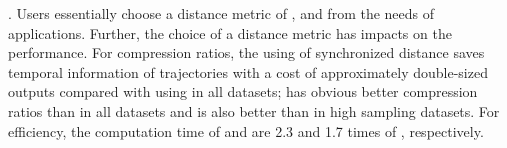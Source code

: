 . Users essentially choose a distance metric of \ped, \sed and \dad from the needs of applications. Further, the choice of a distance metric has impacts on the performance.
For compression ratios, the using of synchronized distance \sed saves temporal information of trajectories with a cost of approximately double-sized outputs compared with using \ped in all datasets; \ped has obvious better compression ratios than \dad in all datasets and \sed is also better than \dad in high sampling datasets.
For efficiency, the computation time of \ped and \sed are 2.3 and 1.7 times of \dad, respectively.



%
%
